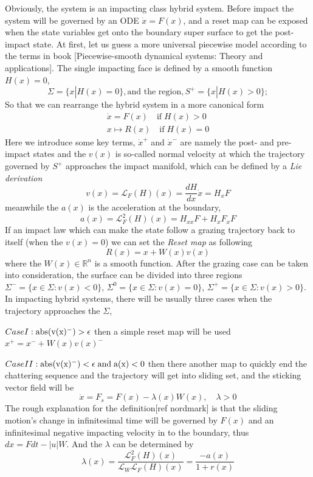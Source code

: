 \documentclass{article}
\begin{document}
Obviously, the system is an impacting class hybrid system. Before impact the system will be governed by an ODE $\dot x= F(x)$, and  a reset map can be exposed when the state variables get onto the boundary super surface to get the post-impact state. At first, let us guess a more universal piecewise model according to the terms in book [Piecewise-smooth dynamical systems: Theory and applications]. The single impacting face is defined by a smooth function  $H(x)=0$, 
\begin{equation}
    \Sigma =  \{x|H(x)=0\}, \text{and the region}, S^+=\{x|H(x)>0\}; 
\end{equation}
So that we can rearrange the hybrid system in a more canonical form
\begin{align}
    \dot x=F(x) \quad \text{if} \; H(x)>0\\
    x \mapsto R(x) \quad \text{if} \; H(x)=0
\end{align}
Here we introduce some key terms, $\dot{x}^+$ and $\dot{x}^-$ are namely the post- and pre-impact states and the $v(x)$ is so-called normal velocity at which the trajectory governed by $S^+$ approaches the impact manifold, which can be defined by a \textit{Lie derivation}
\begin{equation}
    v(x)=\mathcal{L}_{F}(H)(x)=\frac{dH}{dx} \dot x=H_x F
\end{equation}
meanwhile the $a(x)$ is the acceleration at the boundary,
\begin{equation}
    a(x)=\mathcal{L}^2_{F}(H)(x)=H_{xx} F+H_x F_x F
    \label{eq: normal acceleration definition}
\end{equation}
If an impact law which can make the state follow a grazing trajectory back to itself (when the $v(x)=0$) we can set the \textit{Reset map} as following 
\begin{equation}
    R(x)=x+W(x)v(x)
\end{equation}
where the $W(x) \in \mathbb{R}^n$ is a smooth function.
After the grazing case can be taken into consideration, the surface can be divided into three regions $\Sigma^-=\{x \in \Sigma: v(x)<0\}$, $\Sigma^0=\{x \in \Sigma: v(x)=0\}$, $\Sigma^+=\{x \in \Sigma: v(x)>0\}$. In impacting hybrid systems, there will be usually three cases when the trajectory approaches the $\Sigma$,

$Case I: \rm{abs} (v(x)^-)> \epsilon$ then a simple reset map will be used $x^+ =  x^- + W(x) v(x)^-$

$Case II: \rm{abs}(v(x)^-) < \epsilon \;\text{and} \; a(x)<0$ 
then there another map to  
quickly end the chattering sequence and the trajectory will get into sliding set, and the sticking vector field will be 
\begin{equation}
    \dot x= F_s=F(x)-\lambda (x) W(x) ,\quad \lambda>0
\end{equation}
The rough explanation for the definition[ref nordmark] is that the sliding motion's change in infinitesimal time will be governed by $F(x)$ and an infinitesimal negative impacting velocity in to the boundary, thus $dx=F dt - |u|W$. And the $\lambda$ can be determined by 
\[\lambda(x)=\frac{\mathcal{L}^2_F(H)(x)}{\mathcal{L}_{W} \mathcal{L}_F(H)(x)}=\frac{-a(x)}{1+r(x)}\]
\end{document}
